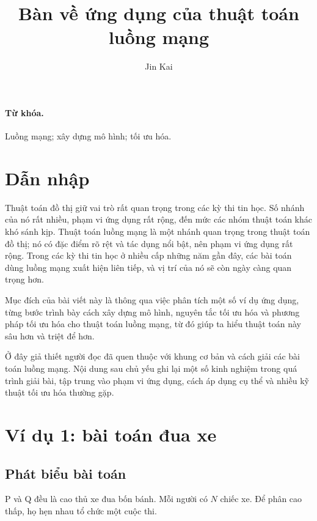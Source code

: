 \documentclass[11pt]{article}
\title{Bàn về ứng dụng của thuật toán luồng mạng}
\author{Jin Kai}
\date{}
\begin{document}
\maketitle


\paragraph{Từ khóa.}
Luồng mạng; xây dựng mô hình; tối ưu hóa.

\tableofcontents

\section{Dẫn nhập}

Thuật toán đồ thị giữ vai trò rất quan trọng trong các kỳ thi tin học. Số
nhánh của nó rất nhiều, phạm vi ứng dụng rất rộng, đến mức các nhóm thuật
toán khác khó sánh kịp. Thuật toán luồng mạng là một nhánh quan trọng trong
thuật toán đồ thị; nó có đặc điểm rõ rệt và tác dụng nổi bật, nên phạm vi ứng
dụng rất rộng. Trong các kỳ thi tin học ở nhiều cấp những năm gần đây, các
bài toán dùng luồng mạng xuất hiện liên tiếp, và vị trí của nó sẽ còn ngày
càng quan trọng hơn.

Mục đích của bài viết này là thông qua việc phân tích một số ví dụ ứng dụng,
từng bước trình bày cách xây dựng mô hình, nguyên tắc tối ưu hóa và phương
pháp tối ưu hóa cho thuật toán luồng mạng, từ đó giúp ta hiểu thuật toán này
sâu hơn và triệt để hơn.

Ở đây giả thiết người đọc đã quen thuộc với khung cơ bản và cách giải các
bài toán luồng mạng. Nội dung sau chủ yếu ghi lại một số kinh nghiệm trong
quá trình giải bài, tập trung vào phạm vi ứng dụng, cách áp dụng cụ thể và
nhiều kỹ thuật tối ưu hóa thường gặp.

\section{Ví dụ 1: bài toán đua xe}

\subsection{Phát biểu bài toán}

P và Q đều là cao thủ xe đua bốn bánh. Mỗi người có \(N\) chiếc xe. Để phân
cao thấp, họ hẹn nhau tổ chức một cuộc thi.
\end{document}

